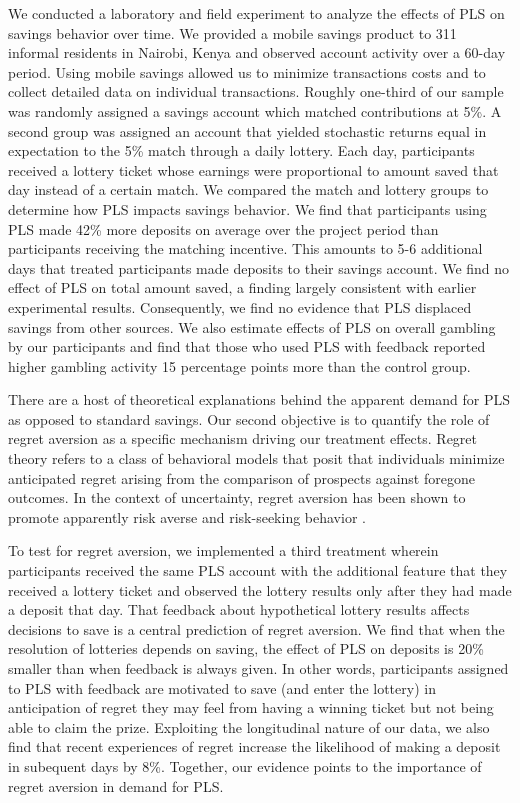 \documentclass[11pt]{article}
\begin{document}
	We conducted a laboratory and field experiment to analyze the effects of PLS on savings behavior over time. We provided a mobile savings product to 311 informal residents in Nairobi, Kenya and observed account activity over a 60-day period. Using mobile savings allowed us to minimize transactions costs and to collect detailed data on individual transactions. Roughly one-third of our sample was randomly assigned a savings account which matched contributions at 5\%. A second group was assigned an account that yielded stochastic returns equal in expectation to the 5\% match through a daily lottery. Each day, participants received a lottery ticket whose earnings were proportional to amount saved that day instead of a certain match. We compared the match and lottery groups to determine how PLS impacts savings behavior. We find that participants using PLS made 42\% more deposits on average over the project period than participants receiving the matching incentive. This amounts to 5-6 additional days that treated participants made deposits to their savings account. We find no effect of PLS on total amount saved, a finding largely consistent with earlier experimental results. Consequently, we find no evidence that PLS displaced savings from other sources. We also estimate effects of PLS on overall gambling by our participants and find that those who used PLS with feedback reported higher gambling activity 15 percentage points more than the control group.

	There are a host of theoretical explanations behind the apparent demand for PLS as opposed to standard savings. Our second objective is to quantify the role of regret aversion \parencite{bell_risk_1983,loomes_regret_1982} as a specific mechanism driving our treatment effects. Regret theory refers to a class of behavioral models that posit that individuals minimize anticipated regret arising from the comparison of prospects against foregone outcomes. In the context of uncertainty, regret aversion has been shown to promote apparently risk averse and risk-seeking behavior  \parencite{zeelenberg_consequences_1996}. 

	To test for regret aversion, we implemented a third treatment wherein participants received the same PLS account with the additional feature that they received a lottery ticket and observed the lottery results only after they had made a deposit that day. That feedback about hypothetical lottery results affects decisions to save is a central prediction of regret aversion. We find that when the resolution of lotteries depends on saving, the effect of PLS on deposits is 20\% smaller than when feedback is always given. In other words, participants assigned to PLS with feedback are motivated to save (and enter the lottery) in anticipation of regret they may feel from having a winning ticket but not being able to claim the prize. Exploiting the longitudinal nature of our data, we also find that recent experiences of regret increase the likelihood of making a deposit in subequent days by 8\%. Together, our evidence points to the importance of regret aversion in demand for PLS.
\end{document}
